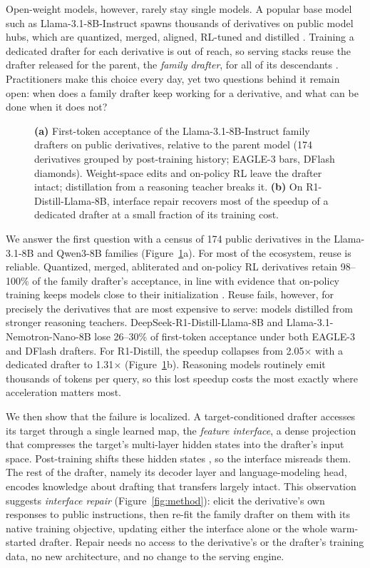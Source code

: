 \documentclass[11pt]{article}
\newcommand{\ours}{interface repair}
\begin{document}
Open-weight models, however, rarely stay single models.
A popular base model such as Llama-3.1-8B-Instruct spawns thousands of derivatives on public model hubs, which are quantized, merged, aligned, RL-tuned and distilled \citep{horwitz2025atlas}.
Training a dedicated drafter for each derivative is out of reach, so serving stacks reuse the drafter released for the parent, the \emph{family drafter}, for all of its descendants \citep{kwon2023vllm,redhat2025speculators}.
Practitioners make this choice every day, yet two questions behind it remain open: when does a family drafter keep working for a derivative, and what can be done when it does not?

\begin{figure}[t]
  \centering
  
  \caption{\textbf{(a)} First-token acceptance of the Llama-3.1-8B-Instruct family drafters on public derivatives, relative to the parent model (174 derivatives grouped by post-training history; EAGLE-3 bars, DFlash diamonds). Weight-space edits and on-policy RL leave the drafter intact; distillation from a reasoning teacher breaks it. \textbf{(b)} On R1-Distill-Llama-8B, \ours{} recovers most of the speedup of a dedicated drafter at a small fraction of its training cost.}
  \label{fig:teaser}
\end{figure}

We answer the first question with a census of 174 public derivatives in the Llama-3.1-8B and Qwen3-8B families (Figure~\ref{fig:teaser}a).
For most of the ecosystem, reuse is reliable.
Quantized, merged, abliterated and on-policy RL derivatives retain 98--100\% of the family drafter's acceptance, in line with evidence that on-policy training keeps models close to their initialization \citep{shenfeld2026razor,chen2026retaining}.
Reuse fails, however, for precisely the derivatives that are most expensive to serve: models distilled from stronger reasoning teachers.
DeepSeek-R1-Distill-Llama-8B and Llama-3.1-Nemotron-Nano-8B lose 26--30\% of first-token acceptance under both EAGLE-3 and DFlash drafters.
For R1-Distill, the speedup collapses from 2.05$\times$ with a dedicated drafter to 1.31$\times$ (Figure~\ref{fig:teaser}b).
Reasoning models routinely emit thousands of tokens per query, so this lost speedup costs the most exactly where acceleration matters most.

We then show that the failure is localized.
A target-conditioned drafter accesses its target through a single learned map, the \emph{feature interface}, a dense projection that compresses the target's multi-layer hidden states into the drafter's input space.
Post-training shifts these hidden states \citep{kumar2022finetuning}, so the interface misreads them.
The rest of the drafter, namely its decoder layer and language-modeling head, encodes knowledge about drafting that transfers largely intact.
This observation suggests \emph{\ours{}} (Figure~\ref{fig:method}): elicit the derivative's own responses to public instructions, then re-fit the family drafter on them with its native training objective, updating either the interface alone or the whole warm-started drafter.
Repair needs no access to the derivative's or the drafter's training data, no new architecture, and no change to the serving engine.
\end{document}
